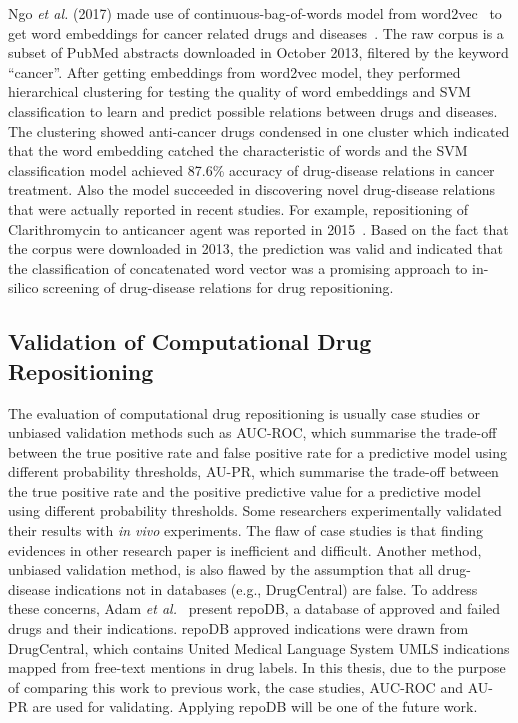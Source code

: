 Ngo \textit{et al.} (2017) made use of continuous-bag-of-words model from word2vec~\cite{mikolov_efficient_2013} to get word embeddings for cancer related drugs and diseases~\cite{ngo_application_2016}. The raw corpus is a subset of PubMed abstracts downloaded in October 2013, filtered by the keyword “cancer”. After getting embeddings from word2vec model, they performed hierarchical clustering for testing the quality of word embeddings and \ac{SVM} classification to learn and predict possible relations between drugs and diseases. The clustering showed anti-cancer drugs condensed in one cluster which indicated that the word embedding catched the characteristic of words and the \ac{SVM} classification model achieved 87.6\% accuracy of drug-disease relations in cancer treatment. Also the model succeeded in discovering novel drug-disease relations that were actually reported in recent studies. For example, repositioning of Clarithromycin to anticancer agent was reported in 2015~\cite{pantziarka_repurposing_2015}. Based on the fact that the corpus were downloaded in 2013, the prediction was valid and indicated that the classification of concatenated word vector was a promising approach to in-silico screening of drug-disease relations for drug repositioning.

\subsection{Validation of Computational Drug Repositioning}

The evaluation of computational drug repositioning is usually case studies or unbiased validation methods such as \ac{AUC-ROC}, which summarise the trade-off between the true positive rate and false positive rate for a predictive model using different probability thresholds, \ac{AU-PR}, which summarise the trade-off between the true positive rate and the positive predictive value for a predictive model using different probability thresholds. Some researchers experimentally validated their results with \textit{in vivo} experiments. The flaw of case studies is that finding evidences in other research paper is inefficient and difficult. Another method, unbiased validation method, is also flawed by the assumption that all drug-disease indications not in databases (e.g., DrugCentral) are false. To address these concerns, Adam \textit{et al.}~\cite{shameer_systematic_2018} present repoDB, a database of approved and failed drugs and their indications. repoDB approved indications were drawn from DrugCentral, which contains United Medical Language System \ac{UMLS} indications mapped from free-text mentions in drug labels. In this thesis, due to the purpose of comparing this work to previous work, the case studies, \ac{AUC-ROC} and \ac{AU-PR} are used for validating. Applying repoDB will be one of the future work.

